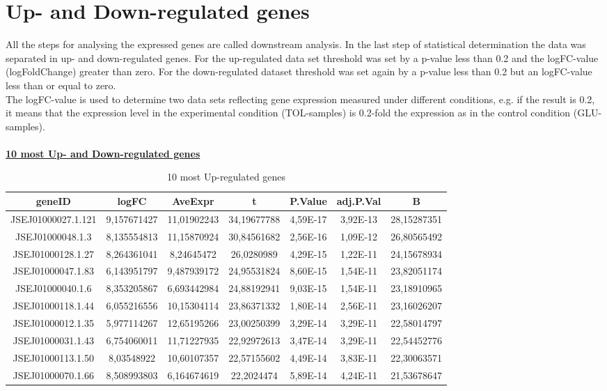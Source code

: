 \documentclass[12pt, a4paper]{report}
\begin{document}
\section{Up- and Down-regulated genes}
All the steps for analysing the expressed genes are called downstream analysis. In the last step of statistical determination the data was separated in up- and down-regulated genes. For the up-regulated data set threshold was set by a p-value less than 0.2 and the logFC-value (logFoldChange) greater than zero. For the down-regulated dataset threshold was set again by a p-value less than 0.2 but an logFC-value less than or equal to zero. \\
The logFC-value is used to determine two data sets reflecting gene expression measured under different conditions, e.g. if the result is 0.2, it means that the expression level in the experimental condition (TOL-samples) is 0.2-fold the expression as in the control condition (GLU-samples). \\
\ \\
\underline{\textbf{10 most Up- and Down-regulated genes}} 
\begin{table}[H]
	\centering
	\scriptsize
	\begin{tabular}{c|c|c|c|c|c|c}
		\textbf{geneID}& \textbf{logFC}&\textbf{AveExpr}&\textbf{t}&\textbf{P.Value}&\textbf{adj.P.Val}& \textbf{B}\\
		\hline
JSEJ01000027.1.121	&9,157671427&	11,01902243&	34,19677788&	4,59E-17&	3,92E-13&	28,15287351\\
JSEJ01000048.1.3&	8,135554813	&11,15870924&	30,84561682&	2,56E-16&	1,09E-12&	26,80565492\\
JSEJ01000128.1.27&	8,264361041&	8,24645472&	26,0280989&	4,29E-15&	1,22E-11&	24,15678934\\
JSEJ01000047.1.83&	6,143951797&	9,487939172&	24,95531824&	8,60E-15&	1,54E-11&	23,82051174\\
JSEJ01000040.1.6&	8,353205867&	6,693442984&	24,88192941&	9,03E-15&	1,54E-11&	23,18910965\\
JSEJ01000118.1.44&	6,055216556&	10,15304114&	23,86371332&	1,80E-14&	2,56E-11&	23,16026207\\
JSEJ01000012.1.35&	5,977114267&	12,65195266&	23,00250399&	3,29E-14&	3,29E-11&	22,58014797\\
JSEJ01000031.1.43&	6,754060011&	11,71227935&	22,92972613&	3,47E-14&	3,29E-11&	22,54452776\\
JSEJ01000113.1.50&	8,03548922&	10,60107357&	22,57155602&	4,49E-14&	3,83E-11&	22,30063571\\
JSEJ01000070.1.66&	8,508993803&	6,164674619&	22,2024474&	5,89E-14&	4,24E-11&	21,53678647\\
		\hline
		\end{tabular}
	\caption{10 most Up-regulated genes}
\end{table}
\end{document}
